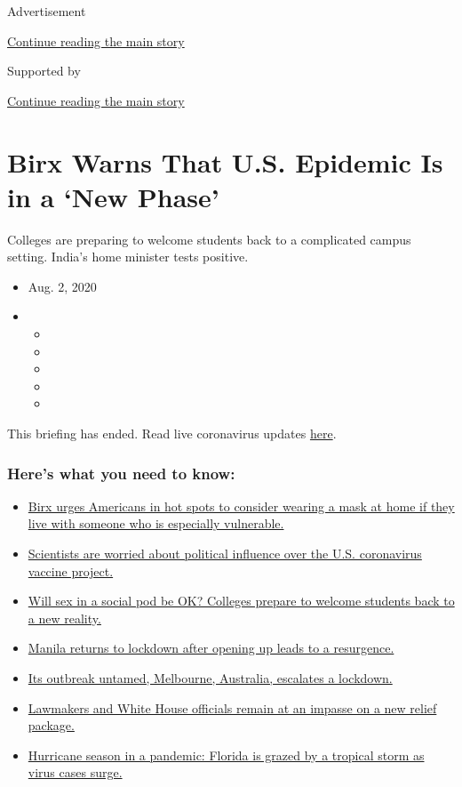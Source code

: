 Advertisement

\protect\hyperlink{after-top}{Continue reading the main story}

Supported by

\protect\hyperlink{after-sponsor}{Continue reading the main story}

\hypertarget{birx-warns-that-us-epidemic-is-in-a-new-phase}{%
\section{Birx Warns That U.S. Epidemic Is in a `New
Phase'}\label{birx-warns-that-us-epidemic-is-in-a-new-phase}}

Colleges are preparing to welcome students back to a complicated campus
setting. India's home minister tests positive.

\begin{itemize}
\item
  Aug. 2, 2020
\item
  \begin{itemize}
  \item
  \item
  \item
  \item
  \item
  \end{itemize}
\end{itemize}

This briefing has ended. Read live coronavirus updates
\href{https://www.nytimes3xbfgragh.onion/2020/08/03/world/coronavirus-covid-19.html}{here}.

\hypertarget{heres-what-you-need-to-know}{%
\subsubsection{Here's what you need to
know:}\label{heres-what-you-need-to-know}}

\begin{itemize}
\tightlist
\item
  \protect\hyperlink{link-4c637647}{Birx urges Americans in hot spots to
  consider wearing a mask at home if they live with someone who is
  especially vulnerable.}
\item
  \protect\hyperlink{link-18bff79b}{Scientists are worried about
  political influence over the U.S. coronavirus vaccine project.}
\item
  \protect\hyperlink{link-79292e3}{Will sex in a social pod be OK?
  Colleges prepare to welcome students back to a new reality.}
\item
  \protect\hyperlink{link-41ce99eb}{Manila returns to lockdown after
  opening up leads to a resurgence.}
\item
  \protect\hyperlink{link-74f9a2b2}{Its outbreak untamed, Melbourne,
  Australia, escalates a lockdown.}
\item
  \protect\hyperlink{link-1a62dbb2}{Lawmakers and White House officials
  remain at an impasse on a new relief package.}
\item
  \protect\hyperlink{link-479653b6}{Hurricane season in a pandemic:
  Florida is grazed by a tropical storm as virus cases surge.}
\end{itemize}

